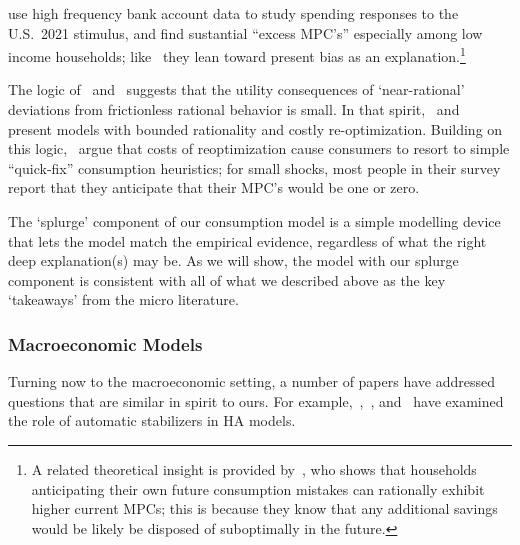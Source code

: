\documentclass[\latexroot/\projectname]{subfiles}
\begin{document}
\cite{indarte2024explains} use high frequency bank account data to study spending responses to the U.S.\ 2021 stimulus, and find sustantial ``excess MPC's'' especially among low income households; like~\cite{lmmPresentBias} they lean toward present bias as an explanation.\footnote{A related theoretical insight is provided by~\cite{Lian2023-ca}, who shows that households anticipating their own future consumption mistakes can rationally exhibit higher current MPCs; this is because they know that any additional savings would be likely be disposed of suboptimally in the future.}

The logic of~\cite{akerlof1985near} and~\cite{cochrane1989sensitivity} suggests that the utility consequences of `near-rational' deviations from frictionless rational behavior is small.
In that spirit,~\cite{BoutrosWindfall} and~\cite{ilutEconomic} present models with bounded rationality and costly re-optimization.  Building on this logic,~\cite{ansQuickfix} argue that costs of reoptimization cause consumers to resort to simple ``quick-fix'' consumption heuristics; for small shocks, most people in their survey report that they anticipate that their MPC's would be one or zero.

The `splurge' component of our consumption model is a simple modelling device that lets the model match the empirical evidence, regardless of what the right deep explanation(s) may be. As we will show, the model with our splurge component is consistent with all of what we described above as the key `takeaways' from the micro literature.

\whenintegrated{\label{macroeconomic-models}}
\subsubsection{Macroeconomic Models}
Turning now to the macroeconomic setting, a number of papers have addressed questions that are similar in spirit to ours.  For example,~\cite{mckay2016role},~\cite{mckay2021optimal}, and~\cite{phan2024welfare} have examined the role of automatic stabilizers in HA models.
\end{document}
